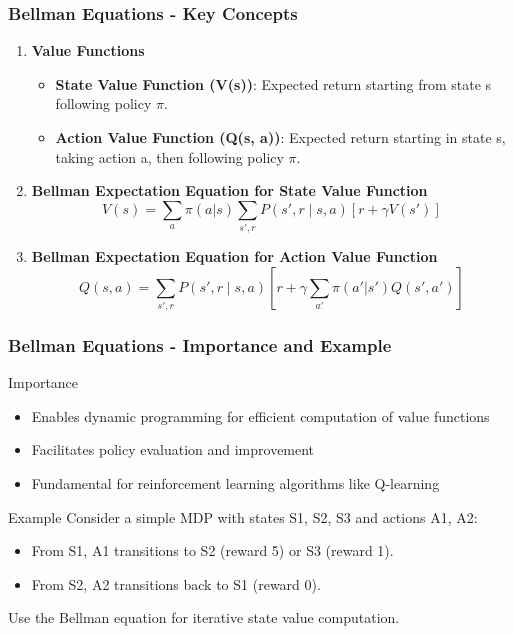 \documentclass[aspectratio=169]{beamer}
\begin{document}
\begin{frame}[fragile]
  \frametitle{Bellman Equations - Key Concepts}
  \begin{enumerate}
    \item \textbf{Value Functions}
      \begin{itemize}
        \item \textbf{State Value Function (V(s))}: Expected return starting from state s following policy $\pi$.
        \item \textbf{Action Value Function (Q(s, a))}: Expected return starting in state s, taking action a, then following policy $\pi$.
      \end{itemize}
    
    \item \textbf{Bellman Expectation Equation for State Value Function}
      \begin{equation}
        V(s) = \sum_{a} \pi(a|s) \sum_{s', r} P(s', r \mid s, a) 
        \left[r + \gamma V(s')\right]
      \end{equation}

    \item \textbf{Bellman Expectation Equation for Action Value Function}
      \begin{equation}
        Q(s, a) = \sum_{s', r} P(s', r \mid s, a) 
        \left[r + \gamma \sum_{a'} \pi(a'|s') Q(s', a')\right]
      \end{equation}
  \end{enumerate}
\end{frame}

\begin{frame}[fragile]
  \frametitle{Bellman Equations - Importance and Example}
  \begin{block}{Importance}
    \begin{itemize}
      \item Enables dynamic programming for efficient computation of value functions
      \item Facilitates policy evaluation and improvement
      \item Fundamental for reinforcement learning algorithms like Q-learning
    \end{itemize}
  \end{block}
  
  \begin{block}{Example}
    Consider a simple MDP with states S1, S2, S3 and actions A1, A2:
    \begin{itemize}
      \item From S1, A1 transitions to S2 (reward 5) or S3 (reward 1).
      \item From S2, A2 transitions back to S1 (reward 0).
    \end{itemize}
    Use the Bellman equation for iterative state value computation.
  \end{block}
\end{frame}
\end{document}
